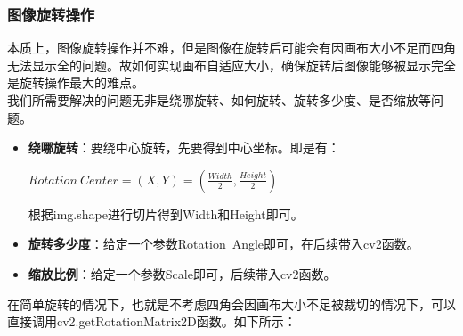 \documentclass[11pt]{article}
\begin{document}
    \subsubsection{图像旋转操作}
    本质上，图像旋转操作并不难，但是图像在旋转后可能会有因画布大小不足而四角无法显示全的问题。故如何实现画布自适应大小，确保旋转后图像能够被显示完全是旋转操作最大的难点。\\
    我们所需要解决的问题无非是绕哪旋转、如何旋转、旋转多少度、是否缩放等问题。
    \begin{itemize}
    	\item \textbf{绕哪旋转}：要绕中心旋转，先要得到中心坐标。即是有：
    	\begin{center}
    		$Rotation\ Center = (X,Y) = (\frac{Width}{2},\frac{Height}{2})$
    	\end{center}
    	根据img.shape进行切片得到Width和Height即可。
    	\item \textbf{旋转多少度}：给定一个参数Rotation\ Angle即可，在后续带入cv2函数。
    	\item \textbf{缩放比例}：给定一个参数Scale即可，后续带入cv2函数。
    \end{itemize}
    在简单旋转的情况下，也就是不考虑四角会因画布大小不足被裁切的情况下，可以直接调用cv2.getRotationMatrix2D函数。如下所示：
   \begin{center}
   \end{center}
   
\end{document}
